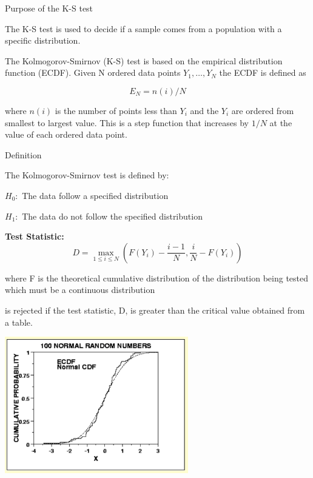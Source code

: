 \documentclass{beamer}
\begin{document}
\begin{frame}
{\centerline{Purpose of the K-S test}}
The K-S test is used to decide if a sample comes from a population with a specific distribution.


The Kolmogorov-Smirnov (K-S) test is based on the empirical distribution function (ECDF). Given N ordered data points $Y_1,\ldots, Y_N$ the ECDF is defined as

$$E_N = n(i)/N$$

where $n(i)$ is the number of points less than $Y_i$ and the $Y_i$ are ordered from smallest to largest value. This is a step function that increases by $1/N$ at the value of each ordered data point.

\end{frame}



\begin{frame}
{\centerline{Definition}}
The Kolmogorov-Smirnov test is defined by:
\newline

\textbf{$H_0:$} The data follow a specified distribution
\newline

\textbf{$H_1:$} The data do not follow the specified distribution
\newline

\textbf{Test Statistic:}
$$D = \max_{1 \leq i \leq N} (F(Y_i) - \frac{i-1}{N}, \frac{i}{N} - F(Y_i))$$

where F is the theoretical cumulative distribution of the distribution being tested which must be a continuous distribution
\newline

is rejected if the test statistic, D, is greater than the critical value obtained from a table.

\end{frame}




\begin{frame}
{\centerline{}}


\begin{center}
\includegraphics[width=8cm]{P2023.AIBCCSS.InferenceAndLogisticRegression/kst.png}
\end{center}

\end{frame}
\end{document}
